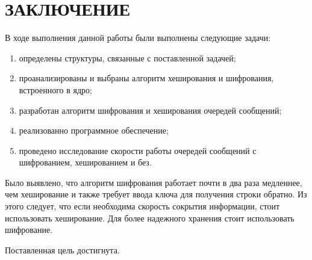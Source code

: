 \section*{\large ЗАКЛЮЧЕНИЕ}

В ходе выполнения данной работы были выполнены следующие задачи:
\begin{enumerate}
    \item определены структуры, связанные с поставленной задачей;
    \item проанализированы и выбраны алгоритм хеширования и шифрования, встроенного в ядро;
    \item разработан алгоритм шифрования и хеширования очередей сообщений;
    \item реализованно программное обеспечение;
    \item проведено исследование скорости работы очередей сообщений с шифрованием, хешированием и без.
\end{enumerate}

Было выявлено, что алгоритм шифрования работает почти в два раза медленнее, чем хеширование и также требует ввода ключа для получения строки обратно.
Из этого следует, что если необходима скорость сокрытия информации, стоит использовать хеширование.
Для более надежного хранения стоит использовать шифрование.

Поставленная цель достигнута.
